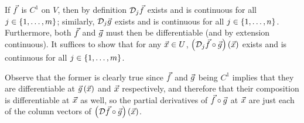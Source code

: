 \documentclass[main.tex]{subfiles}
\begin{document}
\begin{soln}
    If $\vec{f}$ is $C^1$ on $V$, then by definition $\mathcal{D}_j \vec{f}$ exists and is continuous for all $j\in \left\{ 1, \ldots , m \right\}$; similarly, $\mathcal{D}_j \vec{g}$ exists and is continuous for all $j\in \left\{ 1, \ldots , n \right\}$. Furthermore, both $\vec{f}$ and $\vec{g}$ must then be differentiable (and by extension continuous). It suffices to show that for any $\vec{x} \in U$, $\left( \mathcal{D}_j \vec{f}\circ \vec{g} \right)\left( \vec{x} \right)$ exists and is continuous for all $j\in \left\{ 1, \ldots , m \right\}$. 
    
    Observe that the former is clearly true since $\vec{f}$ and $\vec{g}$ being $C^1$ implies that they are differentiable at $\vec{g}\left( \vec{x} \right)$ and $\vec{x}$ respectively, and therefore that their composition is differentiable at $\vec{x}$ as well, so the partial derivatives of $\vec{f}\circ\vec{g}$ at $\vec{x}$ are just each of the column vectors of $\left( \mathcal{D} \vec{f}\circ \vec{g} \right)\left( \vec{x} \right)$.
    

\end{soln}
\end{document}
